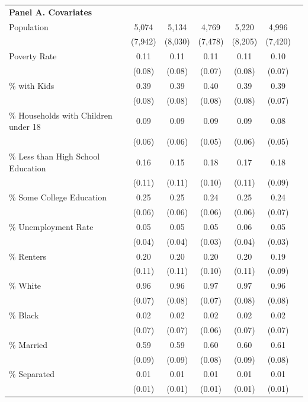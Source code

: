 \begin{longtable}{p{4cm}cccccc}
    \multicolumn{6}{l}{\textbf{Panel A. Covariates}} \\
    Population & 5,074 & 5,134 & 4,769 & 5,220 & 4,996 \\
               & (7,942) & (8,030) & (7,478) & (8,205) & (7,420) \\
    Poverty Rate & 0.11 & 0.11 & 0.11 & 0.11 & 0.10 \\
                 & (0.08) & (0.08) & (0.07) & (0.08) & (0.07) \\
    \% with Kids & 0.39 & 0.39 & 0.40 & 0.39 & 0.39 \\
                 & (0.08) & (0.08) & (0.08) & (0.08) & (0.07) \\
    \% Households with Children under 18 & 0.09 & 0.09 & 0.09 & 0.09 & 0.08 \\
                                         & (0.06) & (0.06) & (0.05) & (0.06) & (0.05) \\
    \% Less than High School Education & 0.16 & 0.15 & 0.18 & 0.17 & 0.18 \\
                                       & (0.11) & (0.11) & (0.10) & (0.11) & (0.09) \\
    \% Some College Education & 0.25 & 0.25 & 0.24 & 0.25 & 0.24 \\
                              & (0.06) & (0.06) & (0.06) & (0.06) & (0.07) \\
    \% Unemployment Rate & 0.05 & 0.05 & 0.05 & 0.06 & 0.05 \\
                         & (0.04) & (0.04) & (0.03) & (0.04) & (0.03) \\
    \% Renters & 0.20 & 0.20 & 0.20 & 0.20 & 0.19 \\
               & (0.11) & (0.11) & (0.10) & (0.11) & (0.09) \\
    \% White & 0.96 & 0.96 & 0.97 & 0.97 & 0.96 \\
             & (0.07) & (0.08) & (0.07) & (0.08) & (0.08) \\
    \% Black & 0.02 & 0.02 & 0.02 & 0.02 & 0.02 \\
             & (0.07) & (0.07) & (0.06) & (0.07) & (0.07) \\
    \% Married & 0.59 & 0.59 & 0.60 & 0.60 & 0.61 \\
               & (0.09) & (0.09) & (0.08) & (0.09) & (0.08) \\
    \% Separated & 0.01 & 0.01 & 0.01 & 0.01 & 0.01 \\
                 & (0.01) & (0.01) & (0.01) & (0.01) & (0.01) \\

\end{longtable}
